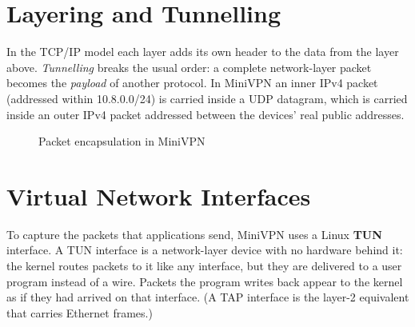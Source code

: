 \documentclass[12pt,a4paper]{report}
\begin{document}
\section{Layering and Tunnelling}
In the TCP/IP model each layer adds its own header to the data from the layer above.
\emph{Tunnelling} breaks the usual order: a complete network-layer packet becomes the
\emph{payload} of another protocol. In MiniVPN an inner IPv4 packet (addressed within
10.8.0.0/24) is carried inside a UDP datagram, which is carried inside an outer IPv4
packet addressed between the devices' real public addresses.

\begin{figure}[H]
\centering
{}
\caption{Packet encapsulation in MiniVPN}
\label{fig:encap}
\end{figure}

\section{Virtual Network Interfaces}
To capture the packets that applications send, MiniVPN uses a Linux \textbf{TUN}
interface. A TUN interface is a network-layer device with no hardware behind it: the
kernel routes packets to it like any interface, but they are delivered to a user
program instead of a wire. Packets the program writes back appear to the kernel as if
they had arrived on that interface. (A TAP interface is the layer-2 equivalent that
carries Ethernet frames.)
\end{document}
